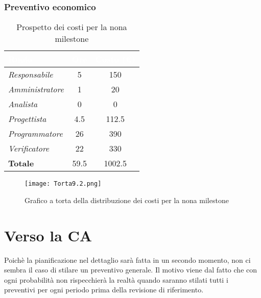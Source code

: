 \newpage
\subsubsection{Preventivo economico}

\begin{table}[H]
    \renewcommand\arraystretch{1.5}
    \centering
    \begin{tabular}{|l|c|c|}
    \hline
    \rowcolor[HTML]{036400}
    \textcolor{white}{\textbf{Ruolo}} & \multicolumn{1}{l|}{\textcolor{white}{\textbf{Ore}}} & \multicolumn{1}{l|}{\textcolor{white}{\textbf{Costo (€)}}} \\ \hline
    \rowcolor[HTML]{EFEFEF}\textit{Responsabile}   & 5    & 150    \\ \hline
    \rowcolor[HTML]{C0C0C0}\textit{Amministratore} & 1    & 20     \\ \hline
    \rowcolor[HTML]{EFEFEF}\textit{Analista}       & 0    & 0      \\ \hline
    \rowcolor[HTML]{C0C0C0}\textit{Progettista}    & 4.5  & 112.5  \\ \hline
    \rowcolor[HTML]{EFEFEF}\textit{Programmatore}  & 26   & 390    \\ \hline
    \rowcolor[HTML]{C0C0C0}\textit{Verificatore}   & 22   & 330    \\ \hline
    \rowcolor[HTML]{EFEFEF}\textbf{Totale}         & 59.5 & 1002.5 \\ \hline
    \end{tabular}
    \caption{Prospetto dei costi per la nona milestone}
\end{table}

\begin{figure}[H]
    \texttt{[image: Torta9.2.png]}
    \caption{Grafico a torta della distribuzione dei costi per la nona milestone}
\end{figure}

\newpage
\section{Verso la CA}

Poichè la pianificazione nel dettaglio sarà fatta in un secondo momento, non ci sembra il caso di stilare un preventivo generale. Il motivo viene dal fatto che con ogni probabilità non rispecchierà la realtà quando saranno stilati tutti i preventivi per ogni periodo prima della revisione di riferimento.
